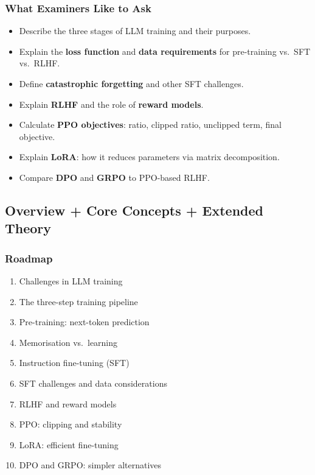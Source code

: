 \separator

\subsubsection*{What Examiners Like to Ask}

\begin{itemize}
  \item Describe the three stages of LLM training and their purposes.
  \item Explain the \textbf{loss function} and \textbf{data requirements} for pre-training vs.\ SFT vs.\ RLHF.
  \item Define \textbf{catastrophic forgetting} and other SFT challenges.
  \item Explain \textbf{RLHF} and the role of \textbf{reward models}.
  \item Calculate \textbf{PPO objectives}: ratio, clipped ratio, unclipped term, final objective.
  \item Explain \textbf{LoRA}: how it reduces parameters via matrix decomposition.
  \item Compare \textbf{DPO} and \textbf{GRPO} to PPO-based RLHF.
\end{itemize}

\bigseparator

\subsection{Overview + Core Concepts + Extended Theory}

\subsubsection*{Roadmap}
\begin{enumerate}
  \item Challenges in LLM training
  \item The three-step training pipeline
  \item Pre-training: next-token prediction
  \item Memorisation vs.\ learning
  \item Instruction fine-tuning (SFT)
  \item SFT challenges and data considerations
  \item RLHF and reward models
  \item PPO: clipping and stability
  \item LoRA: efficient fine-tuning
  \item DPO and GRPO: simpler alternatives
\end{enumerate}

